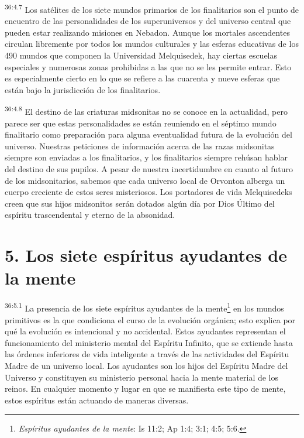 \par
\textsuperscript{36:4.7} Los satélites de los siete mundos primarios de los finalitarios son el punto de encuentro de las personalidades de los superuniversos y del universo central que pueden estar realizando misiones en Nebadon. Aunque los mortales ascendentes circulan libremente por todos los mundos culturales y las esferas educativas de los 490 mundos que componen la Universidad Melquisedek, hay ciertas escuelas especiales y numerosas zonas prohibidas a las que no se les permite entrar. Esto es especialmente cierto en lo que se refiere a las cuarenta y nueve esferas que están bajo la jurisdicción de los finalitarios.

\par
\textsuperscript{36:4.8} El destino de las criaturas midsonitas no se conoce en la actualidad, pero parece ser que estas personalidades se están reuniendo en el séptimo mundo finalitario como preparación para alguna eventualidad futura de la evolución del universo. Nuestras peticiones de información acerca de las razas midsonitas siempre son enviadas a los finalitarios, y los finalitarios siempre rehúsan hablar del destino de sus pupilos. A pesar de nuestra incertidumbre en cuanto al futuro de los midsonitarios, sabemos que cada universo local de Orvonton alberga un cuerpo creciente de estos seres misteriosos. Los portadores de vida Melquisedeks creen que sus hijos midsonitos serán dotados algún día por Dios Último del espíritu trascendental y eterno de la absonidad.

\section*{5. Los siete espíritus ayudantes de la mente}
\par
\textsuperscript{36:5.1} La presencia de los siete espíritus ayudantes de la mente\footnote{\textit{Espíritus ayudantes de la mente}: Is 11:2; Ap 1:4; 3:1; 4:5; 5:6.} en los mundos primitivos es la que condiciona el curso de la evolución orgánica; esto explica por qué la evolución es intencional y no accidental. Estos ayudantes representan el funcionamiento del ministerio mental del Espíritu Infinito, que se extiende hasta las órdenes inferiores de vida inteligente a través de las actividades del Espíritu Madre de un universo local. Los ayudantes son los hijos del Espíritu Madre del Universo y constituyen su ministerio personal hacia la mente material de los reinos. En cualquier momento y lugar en que se manifiesta este tipo de mente, estos espíritus están actuando de maneras diversas.

